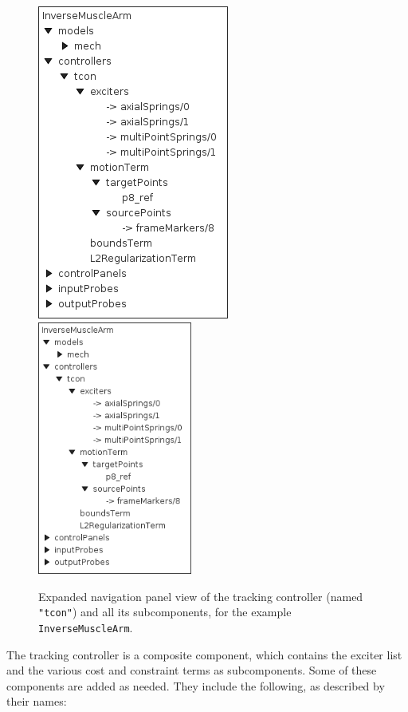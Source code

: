 \begin{figure}[ht]
\begin{center}
\iflatexml
   \includegraphics[]{images/TrackingControllerNavpanel}
\else
   \includegraphics[width=2in]{images/TrackingControllerNavpanel}
\fi
\end{center}
\caption{Expanded navigation panel view of the tracking controller
(named {\tt "tcon"}) and all its subcomponents, for the example {\tt
InverseMuscleArm}.}
\label{TrackingControllerNavpanel:fig}
\end{figure}

The tracking controller is a composite component, which contains the exciter
list and the various cost and constraint terms as subcomponents. Some of these
components are added as needed. They include the following, as described by
their names:

